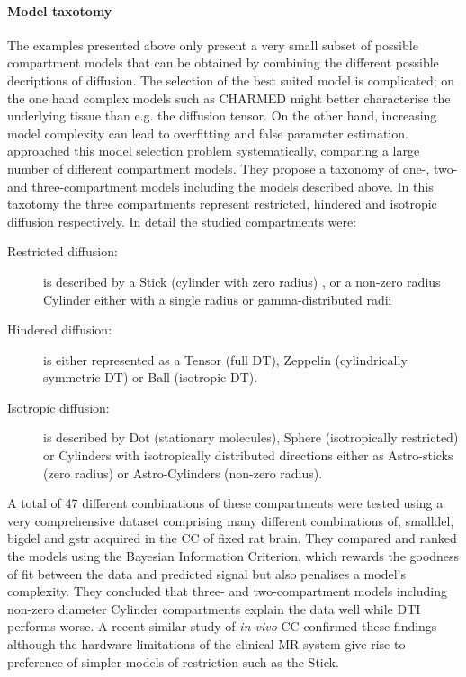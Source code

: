 \paragraph*{Model taxotomy}
The examples presented above only present a very small subset of possible compartment models that can be obtained by combining the different possible decriptions of diffusion. The selection of the best suited model is complicated; on the one hand complex models such as \gls{CHARMED} might better characterise the underlying tissue than e.g. the diffusion tensor. On the other hand, increasing model complexity can lead to overfitting and false parameter estimation. \citet{Panagiotaki:2012} approached this model selection problem systematically, comparing a large number of different compartment models. They propose a taxonomy of one-, two- and three-compartment models including the models described above. In this taxotomy the three compartments represent restricted, hindered and isotropic diffusion respectively. In detail the studied compartments were:
\begin{description}
	\item[Restricted diffusion:] is described by a Stick (cylinder with zero radius) , or a non-zero radius Cylinder either with a single radius or gamma-distributed radii
	\item[Hindered diffusion:] is either represented as a Tensor (full \gls{DT}), Zeppelin (cylindrically symmetric \gls{DT}) or Ball  (isotropic \gls{DT}).  
	\item[Isotropic diffusion:] is described by Dot (stationary molecules), Sphere (isotropically restricted) or Cylinders with isotropically distributed directions either as Astro-sticks (zero radius)  or Astro-Cylinders (non-zero radius).
\end{description}


A total of 47 different combinations of these compartments were tested using a very comprehensive dataset comprising many different combinations of, \gls{smalldel}, \gls{bigdel} and \gls{gstr} acquired in the \gls{CC} of fixed rat brain. They compared and ranked the models using the Bayesian Information Criterion, which rewards the goodness of fit between the data and predicted signal but also penalises a model's complexity.  They concluded that three- and two-compartment models including non-zero diameter Cylinder compartments explain the data well while DTI performs worse. A recent similar study of \emph{in-vivo} \gls{CC} \citep{Ferizi:2012} confirmed these findings although the hardware limitations of the clinical MR system give rise to preference of simpler models of restriction such as the Stick.

